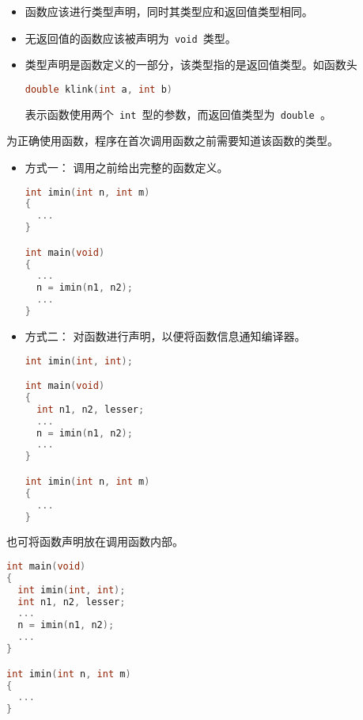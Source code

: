 \begin{frame}[fragile]
\begin{itemize}
\item
函数应该进行类型声明，同时其类型应和返回值类型相同。\\[0.1in]
\item
无返回值的函数应该被声明为\lstinline| void |类型。\\[0.1in]
\item
类型声明是函数定义的一部分，该类型指的是返回值类型。如函数头
\begin{lstlisting}[language=c,backgroundcolor=\color{red!10}]
double klink(int a, int b)
\end{lstlisting}
表示函数使用两个\lstinline| int |型的参数，而返回值类型为\lstinline| double |。
\end{itemize}
\end{frame}

\begin{frame}[fragile]
为正确使用函数，程序在首次调用函数之前需要知道该函数的类型。
\begin{itemize}
\item 方式一：
调用之前给出完整的函数定义。\\[0.1in]
\begin{lstlisting}[language=c,backgroundcolor=\color{red!10}]
int imin(int n, int m)
{
  ... 
}

int main(void)
{
  ...
  n = imin(n1, n2);
  ...
}
\end{lstlisting}
\end{itemize}
\end{frame}

\begin{frame}[fragile]
\begin{itemize}
\item 方式二：
对函数进行声明，以便将函数信息通知编译器。\\[0.1in]
\begin{lstlisting}[language=c,backgroundcolor=\color{red!10}]
int imin(int, int);

int main(void)
{
  int n1, n2, lesser;
  ...
  n = imin(n1, n2);
  ...
}

int imin(int n, int m)
{
  ... 
}
\end{lstlisting}
\end{itemize}
\end{frame}

\begin{frame}[fragile]
也可将函数声明放在调用函数内部。 
\begin{lstlisting}[language=c,backgroundcolor=\color{red!10}]
int main(void)
{
  int imin(int, int);
  int n1, n2, lesser;
  ...
  n = imin(n1, n2);
  ...
}

int imin(int n, int m)
{
  ... 
}
\end{lstlisting}
\end{frame}

